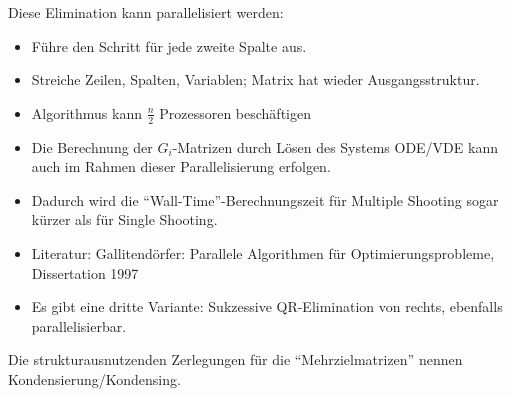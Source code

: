 Diese Elimination kann parallelisiert werden:

\begin{itemize}
\item Führe den Schritt für jede zweite Spalte aus.
\item Streiche Zeilen, Spalten, Variablen; Matrix hat wieder Ausgangsstruktur.
\item Algorithmus kann $\frac n2$ Prozessoren beschäftigen
\item Die Berechnung der $G_i$-Matrizen durch Lösen des Systems ODE/VDE kann auch im Rahmen dieser Parallelisierung erfolgen.
\item Dadurch wird die "`Wall-Time"'-Berechnungszeit für Multiple Shooting sogar kürzer als für Single Shooting.
\item Literatur: Gallitendörfer: Parallele Algorithmen für Optimierungsprobleme, Dissertation 1997
\item Es gibt eine dritte Variante: Sukzessive QR-Elimination von rechts, ebenfalls parallelisierbar.
\end{itemize}


Die strukturausnutzenden Zerlegungen für die "`Mehrzielmatrizen"' nennen Kondensierung/Kondensing.









